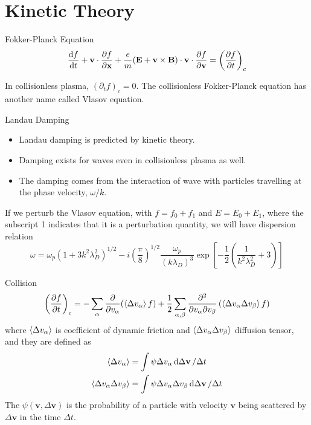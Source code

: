 \section{Kinetic Theory}
\begin{frame}{Fokker-Planck Equation}
    \begin{equation}
        \dv{f}{t} + \mathbf{v}\cdot\pdv{f}{\mathbf{x}} + \frac{e}{m}(\mathbf{E+v\times B})\cdot\mathbf{v}\cdot\pdv{f}{\mathbf{v}} = \left(\pdv{f}{t}\right)_c
        \label{eq:fokker-planck-equation}
    \end{equation}

    In collisionless plasma, $(\partial_tf)_c=0$. The collisionless Fokker-Planck equation has another name called Vlasov equation.
\end{frame}

\begin{frame}{Landau Damping}
    \begin{itemize}
        \item Landau damping is predicted by kinetic theory.
        \item Damping exists for waves even in collisionless plasma as well.
        \item The damping comes from the interaction of wave with particles travelling at the phase velocity, $\omega/k$.
    \end{itemize}
    If we perturb the Vlasov equation, with $f = f_0 + f_1$ and $E = E_0 + E_1$, where the subscript 1 indicates that it is a perturbation quantity, we will have dispersion relation
    \begin{equation}
        \omega = \omega_p(1+3k^2\lambda_D^2)^{1/2} - i\left(\frac{\pi}{8}\right)^{1/2}\frac{\omega_p}{(k\lambda_D)^3}\exp\left[-\frac{1}{2}\left(\frac{1}{k^2\lambda_D^2}+3\right)\right]
        \label{eq:landau-damping}
    \end{equation}
\end{frame}

\begin{frame}{Collision}
    \begin{equation}
        \left(\pdv{f}{t}\right)_c = - \sum_\alpha\pdv{v_\alpha}(\expval{\Delta v_\alpha} f) + \frac{1}{2}\sum_{\alpha,\beta}\pdv[2]{}{v_\alpha}{v_\beta}\,(\expval{\Delta v_\alpha\Delta v_\beta}f)
        \label{eq:fokker-planck-collision-term}
    \end{equation}
    where $\expval{\Delta v_\alpha}$ is coefficient of dynamic friction and $\expval{\Delta v_\alpha\Delta v_\beta}$ diffusion tensor, and they are defined as
    \begin{align}
        \expval{\Delta v_\alpha}               & = \int \psi\Delta v_\alpha\dd{\Delta\mathbf{v}}/\Delta t \label{eq:coefficient-of-dynamic-friction} \\
        \expval{\Delta v_\alpha\Delta v_\beta} & = \int \psi\Delta v_\alpha\Delta v_\beta\dd{\Delta\mathbf{v}}/\Delta t \label{eq:diffusion-tensor}
    \end{align}
    The $\psi(\mathbf{v},\Delta\mathbf{v})$ is the probability of a particle with velocity $\mathbf{v}$ being scattered by $\Delta\mathbf{v}$ in the time $\Delta t$.
\end{frame}

